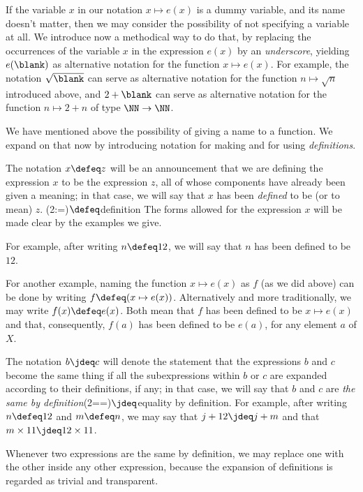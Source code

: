 If the variable $x$ in our notation $x \mapsto e(x)$ is a dummy variable, and its name doesn't matter, then we may consider the possibility of
not specifying a variable at all.  We introduce now a methodical way to do that, by replacing the occurrences of the variable $x$ in the
expression $e(x)$ by an \emph{underscore},
yielding $e(\blank)$ as alternative notation for the function $x \mapsto e(x)$.
For example, the
notation $\sqrt{\vphantom{n}\blank}$ can serve as alternative notation for the function $n \mapsto \sqrt n$ introduced above, and $2 + \blank$ can serve as
alternative notation for the function $n \mapsto 2 + n$ of type $\NN \to \NN$.

We have mentioned above the possibility of giving a name to a function.
We expand on that now by introducing notation for making and for using \emph{definitions}.

The notation $x \defeq z$ will be an announcement that we are defining
the expression $x$ to be the expression $z$, all of whose components have already been given a meaning;
in that case, we will say that $x$ has been \emph{defined} to be (or to mean) $z$.%
\glossary(2:=){$\protect\defeq$}{definition}
The forms allowed for the expression $x$ will be made clear by the examples we give.

For example, after writing $n \defeq 12$, we will say that $n$ has
been defined to be $12$.

For another example, naming the function $x \mapsto e(x)$ as $f$
(as we did above) can be done by writing $f \defeq ( x \mapsto e(x) )$.
Alternatively and more traditionally, we may write $f(x) \defeq e(x)$.
Both mean that $f$ has been defined to be $x \mapsto e(x)$
and that, consequently, $f(a)$ has been defined to be $e(a)$,
for any element $a$ of $X$.

The notation $b \jdeq c$ will denote the statement that the expressions $b$ and $c$ become the same thing if all the subexpressions within $b$
or $c$ are expanded according to their definitions, if any; in that case, we will say that $b$ and $c$ are \emph{the same by
definition}\glossary(2==){$\jdeq$}{equality by definition}.  For example, after writing $n \defeq 12$ and $m \defeq n$, we may say that $j + 12
\jdeq j + m$ and that $m \times 11 \jdeq 12 \times 11$.

Whenever two expressions are the same by definition, we may replace one with the other inside any other expression, because the expansion of
definitions is regarded as trivial and transparent.

